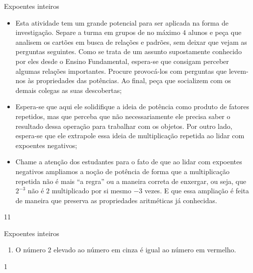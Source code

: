 \begin{sugestions}{Expoentes inteiros}
{
\begin{itemize}

\item Esta atividade tem um grande potencial para ser aplicada na forma de investigação. Separe a turma em grupos de no máximo $4$ alunos e peça que analisem os cartões em busca de relações e padrões, sem deixar que vejam as perguntas seguintes. Como se trata de um assunto supostamente conhecido por eles desde o Ensino Fundamental, espera-se que consigam perceber algumas relações importantes. Procure provocá-los com perguntas que levem-nos às propriedades das potências. Ao final, peça que socializem com os demais colegas as suas descobertas;

\item Espera-se que aqui ele solidifique a ideia de potência como produto de fatores repetidos, mas que perceba que não necessariamente ele precisa saber o resultado dessa operação para trabalhar com os objetos. Por outro lado, espera-se que ele extrapole essa ideia de multiplicação repetida ao lidar com expoentes negativos;

\item Chame a atenção dos estudantes para o fato de que ao lidar com expoentes negativos ampliamos a noção de potência de forma que a multiplicação repetida não é mais “a regra” ou a maneira correta de enxergar, ou seja, que $2^{-3}$ não é $2$ multiplicado por si mesmo $-3$ vezes. E que essa ampliação é feita de maneira que preserva as propriedades aritméticas já conhecidas.

\end{itemize}
}{1}{1}
\end{sugestions}
\begin{answer}{Expoentes inteiros}
{
\begin{enumerate}
\item
O número $2$ elevado ao número em cinza é igual ao número em vermelho.

\end{enumerate}
}{1}
\end{answer}
\clearmargin
\marginpar{\vspace{.5em}}
